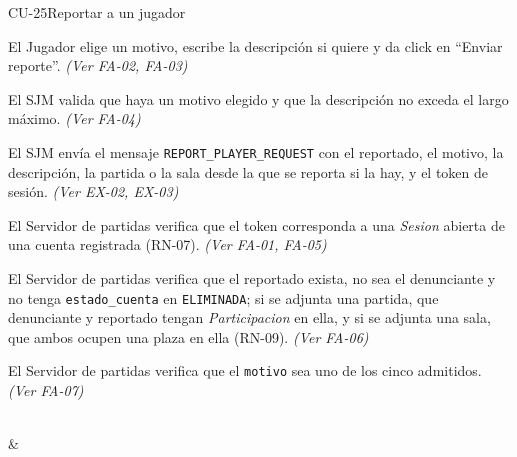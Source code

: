 \begin{fichacu}{CU-25}{Reportar a un jugador}
{\begin{cuenum}[start=1]
      \item El Jugador elige un motivo, escribe la descripción si quiere y da click en ``Enviar reporte''. \textit{(Ver \mbox{FA-02}, \mbox{FA-03})}
      \item El SJM valida que haya un motivo elegido y que la descripción no exceda el largo máximo. \textit{(Ver \mbox{FA-04})}
      \item El SJM envía el mensaje \texttt{REPORT\_\allowbreak{}PLAYER\_\allowbreak{}REQUEST} con el reportado, el motivo, la descripción, la partida o la sala desde la que se reporta si la hay, y el token de sesión. \textit{(Ver \mbox{EX-02}, \mbox{EX-03})}
      \item El Servidor de partidas verifica que el token corresponda a una \textit{Sesion} abierta de una cuenta registrada (\mbox{RN-07}). \textit{(Ver \mbox{FA-01}, \mbox{FA-05})}
      \item El Servidor de partidas verifica que el reportado exista, no sea el denunciante y no tenga \texttt{estado\_\allowbreak{}cuenta} en \texttt{ELIMINADA}; si se adjunta una partida, que denunciante y reportado tengan \textit{Participacion} en ella, y si se adjunta una sala, que ambos ocupen una plaza en ella (\mbox{RN-09}). \textit{(Ver \mbox{FA-06})}
      \item El Servidor de partidas verifica que el \texttt{motivo} sea uno de los cinco admitidos. \textit{(Ver \mbox{FA-07})}
    \end{cuenum}} \\
   & 
\end{fichacu}
